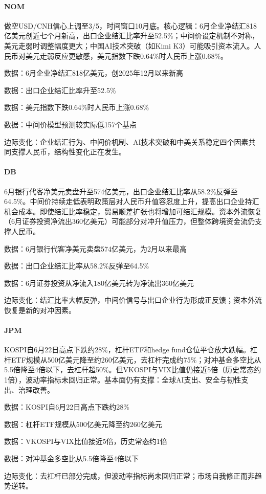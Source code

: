 \documentclass[11pt]{ctexart}
\begin{document}
\paragraph{NOM} 做空USD/CNH信心上调至3/5，时间窗口10月底。核心逻辑：6月企业净结汇818亿美元创近七个月新高，出口企业结汇比率升至52.5\%；中间价设定机制不对称，美元走弱时调整幅度更大；中国AI技术突破（如Kimi K3）可能吸引资本流入。人民币对美元走弱反应更敏感，美元指数下跌0.64\%时人民币上涨0.68\%。
{\small\color{refgray}数据：6月企业净结汇818亿美元，创2025年12月以来新高\par}
{\small\color{refgray}数据：出口企业结汇比率升至52.5\%\par}
{\small\color{refgray}数据：美元指数下跌0.64\%时人民币上涨0.68\%\par}
{\small\color{refgray}数据：中间价模型预测较实际低157个基点\par}
{\small\color{refgray}边际变化：企业结汇行为、中间价机制、AI技术突破和中美关系稳定四个因素共同支撑人民币，结构性变化正在发生。\par}
\paragraph{DB} 6月银行代客净美元卖盘升至574亿美元，出口企业结汇比率从58.2\%反弹至64.5\%。中间价持续走低表明政策层对人民币升值容忍度上升，提高出口企业持汇机会成本。即使结汇比率稳定，贸易顺差扩张也将增加可结汇规模。资本外流恢复（6月证券投资净流出360亿美元）可能部分对冲升值压力，但整体跨境资金流仍支撑人民币。
{\small\color{refgray}数据：6月银行代客净美元卖盘574亿美元，为2月以来最高\par}
{\small\color{refgray}数据：出口企业结汇比率从58.2\%反弹至64.5\%\par}
{\small\color{refgray}数据：6月证券投资从净流入180亿美元转为净流出360亿美元\par}
{\small\color{refgray}边际变化：结汇比率大幅反弹，中间价信号与出口企业行为形成正反馈；资本外流恢复是新的对冲因素。\par}
\paragraph{JPM} KOSPI自6月22日高点下跌约28\%，杠杆ETF和hedge fund仓位平仓放大跌幅。杠杆ETF规模从500亿美元降至约260亿美元，去杠杆完成约75\%；对冲基金多空比从5.5倍降至4倍以下，去杠杆超50\%。但VKOSPI与VIX比值仍接近5倍（历史常态约1倍），波动率指标未回归正常。基本面仍有支撑：全球AI支出、安全与韧性支出、治理改善。
{\small\color{refgray}数据：KOSPI自6月22日高点下跌约28\%\par}
{\small\color{refgray}数据：杠杆ETF规模从500亿美元降至约260亿美元\par}
{\small\color{refgray}数据：VKOSPI与VIX比值接近5倍，历史常态约1倍\par}
{\small\color{refgray}数据：对冲基金多空比从5.5倍降至4倍以下\par}
{\small\color{refgray}边际变化：去杠杆已部分完成，但波动率指标尚未回归正常；市场自我修正而非趋势逆转。\par}
\end{document}
